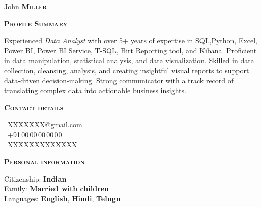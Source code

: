 \documentclass[11pt, a4paper]{article}
\newcommand{\headleft}[1]{\vspace*{3ex}\textsc{\textbf{#1}}\par%
    \vspace*{-1.5ex}\hrulefill\par\vspace*{0.7ex}}
\begin{document}
\setlength{\topskip}{0pt}
\setlength{\parindent}{0pt}
\setlength{\parskip}{0pt}
\setlength{\fboxsep}{0pt}
\pagestyle{empty}
\raggedbottom

\begin{minipage}[t]{0.33\textwidth} %
\colorbox{cvblue}{\begin{minipage}[t][5mm][t]{\textwidth}\null\hfill\null\end{minipage}}

\vspace{-.2ex} %
\colorbox{cvblue!90}{\color{white}  %
\textwidth\relax%
\begin{minipage}[t][293mm][t]{0.82\textwidth}
\raggedright
\vspace*{2.5ex}

\Large John \textbf{\textsc{Miller}} \normalsize 


\vspace*{0.5ex} %

\headleft{Profile Summary}
Experienced \textit{Data Analyst} with over 5+ years of expertise in SQL,Python, Excel, Power BI, Power BI Service, T-SQL, Birt Reporting tool, and Kibana. Proficient in data manipulation, statistical analysis, and data visualization. Skilled in data collection, cleansing, analysis, and creating insightful visual reports to support data-driven decision-making. Strong communicator with a track record of translating complex data into actionable business insights.

\headleft{Contact details}
\small %
\MVAt\ {\small XXXXXXX@gmail.com} \\[0.4ex]
\Mobilefone\ +91\,00\,00\,00\,00\,00 \\[0.5ex]
\Letter\ XXXXXXXXXXXXX
\normalsize

\headleft{Personal information}
Citizenship: \textbf{Indian} \\[0.5ex]
Family: \textbf{Married with children} \\[0.5ex]
Languages: \textbf{English}, \textbf{Hindi}, \textbf{Telugu}


\end{minipage}}
\end{minipage}
\end{document}
